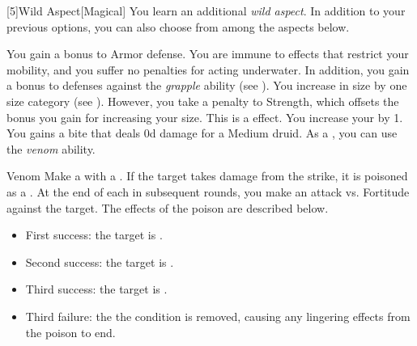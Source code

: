         [5]{Wild Aspect}[Magical]
        You learn an additional \textit{wild aspect}.
        In addition to your previous options, you can also choose from among the aspects below.
        {
             You gain a  bonus to Armor defense.
             You are immune to effects that restrict your mobility, and you suffer no penalties for acting underwater.
            In addition, you gain a  bonus to defenses against the \textit{grapple} ability (see ).
            You increase in size by one size category (see ).
            However, you take a  penalty to Strength, which offsets the bonus you gain for increasing your size.
            This is a  effect.
            You increase your  by 1.
            You gains a bite  that deals \plus0d damage for a Medium druid.
            As a , you can use the \textit{venom} ability.
            \begin{ability}{Venom}
                Make a  with a .
                If the target takes damage from the strike, it is poisoned as a .
                At the end of each  in subsequent rounds, you make an attack vs. Fortitude against the target.
                The effects of the poison are described below.
                \begin{itemize}
                    \item First success: the target is \sickened.
                    \item Second success: the target is \nauseated.
                    \item Third success: the target is \paralyzed.
                    \item Third failure: the the condition is removed, causing any lingering effects from the poison to end.
                \end{itemize}
            \end{ability}
        }

